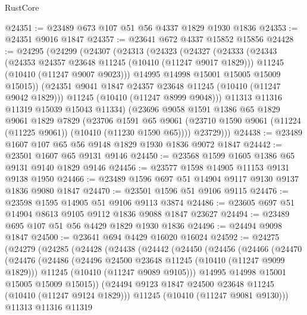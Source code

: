 \begin{lexlean}{RustCore}
\begin{coremodule}
@24351 := @23489 @673 @107 @51 @56 @4337 @1829 @1930 @1836
@24353 := @24351 @9016 @1847
@24357 := @23641 @672 @4337 @15852 @15856
@24428 := @24295
    (@24299
      (@24307
        (@24313
          (@24323
            (@24327
              (@24333
                (@24343
                  (@24353 @24357 @23648 @11245 (@10410 (@11247 @9017 @1829)))
                  @11245
                  (@10410 (@11247 @9007 @9023)))
                @14995
                @14998
                @15001
                @15005
                @15009
                @15015))
            (@24351 @9041 @1847 @24357 @23648 @11245 (@10410 (@11247 @9042 @1829)))
            @11245
            (@10410 (@11247 @8999 @9048)))
          @11313
          @11316
          @11319
          @15039
          @15043
          @11334)
        (@23696
          @9058
          @1591
          @1386
          @65
          @1829
          @9061
          @1829
          @7829
          (@23706
            @1591
            @65
            @9061
            (@23710 @1590 @9061 (@11224 (@11225 @9061)) (@10410 (@11230 @1590 @65))))
          @23729)))
@24438 := @23489 @1607 @107 @65 @56 @9148 @1829 @1930 @1836 @9072 @1847
@24442 := @23501 @1607 @65 @9131 @9146
@24450 := @23568 @1599 @1605 @1386 @65 @9131 @9140 @1829 @9146
@24456 := @23577 @1598 @14905 @11153 @9131 @9138 @1950
@24466 := @23489 @1596 @697 @51 @14904 @9117 @9130 @9137 @1836 @9080 @1847
@24470 := @23501 @1596 @51 @9106 @9115
@24476 := @23598 @1595 @14905 @51 @9106 @9113 @3874
@24486 := @23605 @697 @51 @14904 @8613 @9105 @9112 @1836 @9088 @1847 @23627
@24494 := @23489 @695 @107 @51 @56 @4429 @1829 @1930 @1836
@24496 := @24494 @9098 @1847
@24500 := @23641 @694 @4429 @16020 @16024
@24592 := @24275
    (@24279
      (@24285
        (@24428
          (@24438
            (@24442
              (@24450
                (@24456
                  (@24466
                    (@24470
                      (@24476
                        (@24486
                          (@24496 @24500 @23648 @11245 (@10410 (@11247 @9099 @1829)))
                          @11245
                          (@10410 (@11247 @9089 @9105)))
                        @14995
                        @14998
                        @15001
                        @15005
                        @15009
                        @15015))
                    (@24494 @9123 @1847 @24500 @23648 @11245 (@10410 (@11247 @9124 @1829)))
                    @11245
                    (@10410 (@11247 @9081 @9130)))
                  @11313
                  @11316
                  @11319

\end{coremodule}
\end{lexlean}
